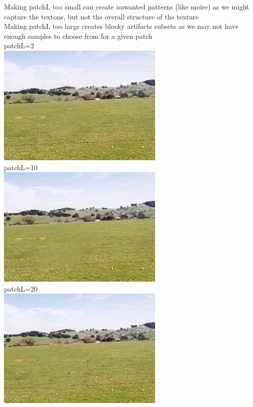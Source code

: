 \documentclass[]{article}
\begin{document}
Making patchL too small can create unwanted patterns (like moire) as we might capture the textons, but not the overall structure of the texture\\
Making patchL too large creates blocky artifacts subsets as we may not have enough samples to choose from for a given patch \\
patchL=2\\
\includegraphics[width=0.7\linewidth]{donkey_results_patch2.jpg}\\
patchL=10\\
\includegraphics[width=0.7\linewidth]{donkey_results_sd1.jpg}\\
patchL=20\\
\includegraphics[width=0.7\linewidth]{donkey_results_patch20.jpg}\\
\end{document}

